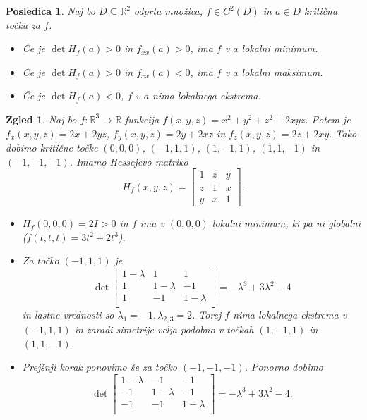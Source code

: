 \documentclass[10pt, a4paper]{article}
\newtheorem{posledica}[izr]{Posledica}
\newtheorem{zgled}{Zgled}[section]
\newcommand{\R}{\mathbb {R}}
\begin{document}
\begin{posledica}
    Naj bo $D \subseteq \R^2$ odprta množica, $f \in C^2 (D)$ in $a \in D$ kritična točka za $f$.
    \begin{itemize}
        \item Če je $\det H_f (a) > 0$ in $f_{xx} (a) > 0$, ima $f$ v $a$ lokalni minimum.
        \item Če je $\det H_f (a) > 0$ in $f_{xx} (a) < 0$, ima $f$ v $a$ lokalni maksimum.
        \item Če je $\det H_f (a) < 0$, $f$ v $a$ nima lokalnega ekstrema.
    \end{itemize}
\end{posledica}

\begin{zgled}
    Naj bo $f: \R^3 \to \R$ funkcija $f(x,y,z) = x^2 + y^2 + z^2 + 2xyz$.
    Potem je $f_x (x,y,z) = 2x + 2yz$, $f_y (x,y,z) = 2y + 2xz$ in $f_z (x,y,z) = 2z + 2xy$.
    Tako dobimo kritične točke $(0,0,0)$, $(-1,1,1)$, $(1,-1,1)$, $(1,1,-1)$ in $(-1,-1,-1)$.
    Imamo Hessejevo matriko 
    $$H_f (x,y,z) = \begin{bmatrix}
        1 & z & y\\
        z & 1 & x\\
        y & x & 1
    \end{bmatrix}.$$
    \begin{itemize}
        \item $H_f (0,0,0) = 2 I > 0$ in $f$ ima v $(0,0,0)$ lokalni minimum, ki pa ni globalni ($f(t,t,t) = 3t^2 + 2t^3$).
        \item Za točko $(-1, 1, 1)$ je $$\det \begin{bmatrix}
            1 - \lambda & 1 & 1\\
            1 & 1 - \lambda & - 1\\
            1 & - 1 & 1 - \lambda\\
        \end{bmatrix} = -\lambda^3 + 3 \lambda^2 - 4$$ in lastne vrednosti so $\lambda_1 = -1, \lambda_{2, 3} = 2$.
        Torej $f$ nima lokalnega ekstrema v $(-1,1,1)$ in zaradi simetrije velja podobno v točkah $(1, -1, 1)$ in $(1, 1, -1)$.
        \item Prejšnji korak ponovimo še za točko $(-1, -1, -1)$. Ponovno dobimo 
        $$\det \begin{bmatrix}
            1-\lambda & -1 & -1\\
            -1 & 1-\lambda & -1\\
            -1 & -1 & 1-\lambda\\
        \end{bmatrix} = -\lambda^3 + 3 \lambda^2 - 4.$$
    \end{itemize}
\end{zgled}
\end{document}
